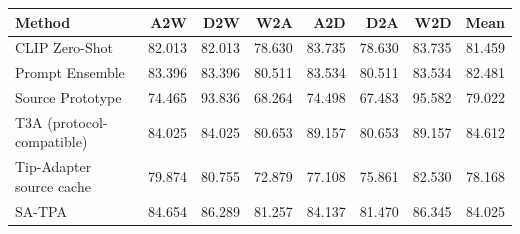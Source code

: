 \begin{tabular}{lrrrrrrr}
\toprule
Method & A2W & D2W & W2A & A2D & D2A & W2D & Mean \\
\midrule
CLIP Zero-Shot & 82.013 & 82.013 & 78.630 & 83.735 & 78.630 & 83.735 & 81.459 \\
Prompt Ensemble & 83.396 & 83.396 & 80.511 & 83.534 & 80.511 & 83.534 & 82.481 \\
Source Prototype & 74.465 & 93.836 & 68.264 & 74.498 & 67.483 & 95.582 & 79.022 \\
T3A (protocol-compatible) & 84.025 & 84.025 & 80.653 & 89.157 & 80.653 & 89.157 & 84.612 \\
Tip-Adapter source cache & 79.874 & 80.755 & 72.879 & 77.108 & 75.861 & 82.530 & 78.168 \\
SA-TPA & 84.654 & 86.289 & 81.257 & 84.137 & 81.470 & 86.345 & 84.025 \\
\bottomrule
\end{tabular}
